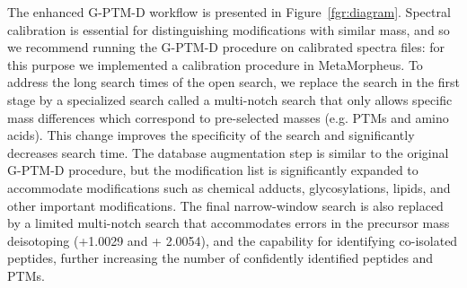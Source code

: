\documentclass[journal=jprobs,manuscript=article]{achemso}
\begin{document}
The enhanced G-PTM-D workflow is presented in Figure~\ref{fgr:diagram}.
Spectral calibration is essential for distinguishing modifications with similar mass, and so we recommend running the G-PTM-D procedure on calibrated spectra files: for this purpose we implemented a calibration procedure in MetaMorpheus.
To address the long search times of the open search, we replace the search in the first stage by a specialized search called a multi-notch search that only allows specific mass differences which correspond to pre-selected masses (e.g. PTMs and amino acids).
This change improves the specificity of the search and significantly decreases search time.
The database augmentation step is similar to the original G-PTM-D procedure, but the modification list is significantly expanded to accommodate modifications such as chemical adducts, glycosylations, lipids, and other important modifications.
The final narrow-window search is also replaced by a limited multi-notch search that accommodates errors in the precursor mass deisotoping (+1.0029 and + 2.0054), and the capability for identifying co-isolated peptides, further increasing the number of confidently identified peptides and PTMs.
\end{document}
